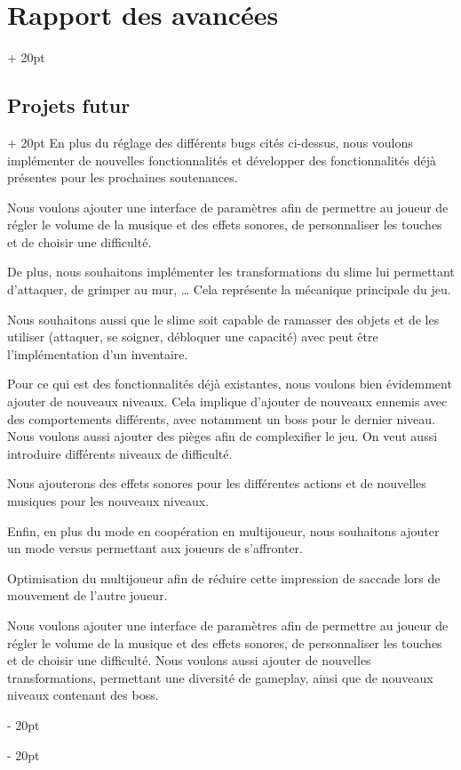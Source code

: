 \documentclass[a4paper, 12pt, twoside]{article}
\newcommand{\ind}[1][20pt]{\advance\leftskip + #1}
\newcommand{\deind}[1][20pt]{\advance\leftskip - #1}
\newenvironment{indt}[2][20pt]{#2 \par \ind[#1]}{\par \deind} %
\begin{document}
\begin{indt}{\section{Rapport des avancées}}
        \begin{indt}{\subsection{Projets futur}}
            En plus du réglage des différents bugs cités ci-dessus, nous voulons implémenter de nouvelles fonctionnalités et développer des fonctionnalités déjà présentes pour les prochaines soutenances.

            Nous voulons ajouter une interface de paramètres afin de permettre au joueur de régler le volume de la musique et des effets sonores, de personnaliser les touches et de choisir une difficulté.
            
            De plus, nous souhaitons implémenter les transformations du slime lui permettant d'attaquer, de grimper au mur, … Cela représente la mécanique principale du jeu.
            
            Nous souhaitons aussi que le slime soit capable de ramasser des objets et de les utiliser (attaquer, se soigner, débloquer une capacité) avec peut être l'implémentation d'un inventaire.
            
            Pour ce qui est des fonctionnalités déjà existantes, nous voulons bien évidemment ajouter de nouveaux niveaux. Cela implique d'ajouter de nouveaux ennemis avec des comportements différents, avec notamment un boss pour le dernier niveau. Nous voulons aussi ajouter des pièges afin de complexifier le jeu. On veut aussi introduire différents niveaux de difficulté.
            
            Nous ajouterons des effets sonores pour les différentes actions et de nouvelles musiques pour les nouveaux niveaux.
            
            Enfin, en plus du mode en coopération en multijoueur, nous souhaitons ajouter un mode versus permettant aux joueurs de s'affronter.
            
            Optimisation du multijoueur afin de réduire cette impression de saccade lors de mouvement de l'autre joueur.
            
            Nous voulons ajouter une interface de paramètres afin de permettre au joueur de régler le volume de la musique et des effets sonores, de personnaliser les touches et de choisir une difficulté. Nous voulons aussi ajouter de nouvelles transformations, permettant une diversité de gameplay, ainsi que de nouveaux niveaux contenant des boss.


\end{indt}
\end{indt}
\end{document}
